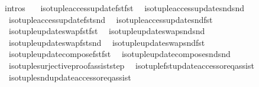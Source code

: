 \begin{isabellebody}
%
\endisadelimproof
\isanewline
{}\isamarkupfalse%
\ intros\ {\isacharequal}{\kern0pt}\isanewline
\ \ iso{\isacharunderscore}{\kern0pt}tuple{\isacharunderscore}{\kern0pt}access{\isacharunderscore}{\kern0pt}update{\isacharunderscore}{\kern0pt}fst{\isacharunderscore}{\kern0pt}fst\isanewline
\ \ iso{\isacharunderscore}{\kern0pt}tuple{\isacharunderscore}{\kern0pt}access{\isacharunderscore}{\kern0pt}update{\isacharunderscore}{\kern0pt}snd{\isacharunderscore}{\kern0pt}snd\isanewline
\ \ iso{\isacharunderscore}{\kern0pt}tuple{\isacharunderscore}{\kern0pt}access{\isacharunderscore}{\kern0pt}update{\isacharunderscore}{\kern0pt}fst{\isacharunderscore}{\kern0pt}snd\isanewline
\ \ iso{\isacharunderscore}{\kern0pt}tuple{\isacharunderscore}{\kern0pt}access{\isacharunderscore}{\kern0pt}update{\isacharunderscore}{\kern0pt}snd{\isacharunderscore}{\kern0pt}fst\isanewline
\ \ iso{\isacharunderscore}{\kern0pt}tuple{\isacharunderscore}{\kern0pt}update{\isacharunderscore}{\kern0pt}swap{\isacharunderscore}{\kern0pt}fst{\isacharunderscore}{\kern0pt}fst\isanewline
\ \ iso{\isacharunderscore}{\kern0pt}tuple{\isacharunderscore}{\kern0pt}update{\isacharunderscore}{\kern0pt}swap{\isacharunderscore}{\kern0pt}snd{\isacharunderscore}{\kern0pt}snd\isanewline
\ \ iso{\isacharunderscore}{\kern0pt}tuple{\isacharunderscore}{\kern0pt}update{\isacharunderscore}{\kern0pt}swap{\isacharunderscore}{\kern0pt}fst{\isacharunderscore}{\kern0pt}snd\isanewline
\ \ iso{\isacharunderscore}{\kern0pt}tuple{\isacharunderscore}{\kern0pt}update{\isacharunderscore}{\kern0pt}swap{\isacharunderscore}{\kern0pt}snd{\isacharunderscore}{\kern0pt}fst\isanewline
\ \ iso{\isacharunderscore}{\kern0pt}tuple{\isacharunderscore}{\kern0pt}update{\isacharunderscore}{\kern0pt}compose{\isacharunderscore}{\kern0pt}fst{\isacharunderscore}{\kern0pt}fst\isanewline
\ \ iso{\isacharunderscore}{\kern0pt}tuple{\isacharunderscore}{\kern0pt}update{\isacharunderscore}{\kern0pt}compose{\isacharunderscore}{\kern0pt}snd{\isacharunderscore}{\kern0pt}snd\isanewline
\ \ iso{\isacharunderscore}{\kern0pt}tuple{\isacharunderscore}{\kern0pt}surjective{\isacharunderscore}{\kern0pt}proof{\isacharunderscore}{\kern0pt}assist{\isacharunderscore}{\kern0pt}step\isanewline
\ \ iso{\isacharunderscore}{\kern0pt}tuple{\isacharunderscore}{\kern0pt}fst{\isacharunderscore}{\kern0pt}update{\isacharunderscore}{\kern0pt}accessor{\isacharunderscore}{\kern0pt}eq{\isacharunderscore}{\kern0pt}assist\isanewline
\ \ iso{\isacharunderscore}{\kern0pt}tuple{\isacharunderscore}{\kern0pt}snd{\isacharunderscore}{\kern0pt}update{\isacharunderscore}{\kern0pt}accessor{\isacharunderscore}{\kern0pt}eq{\isacharunderscore}{\kern0pt}assist\isanewline

\end{isabellebody}
